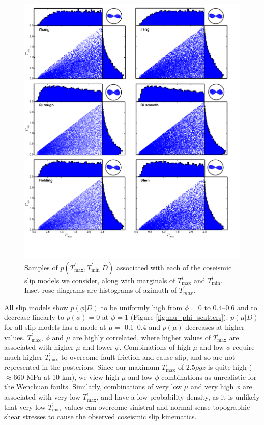 \documentclass[twocolumn,jgrga]{AGUTeX}
\begin{document}
\begin{article}
\begin{figure}%
\centering
\includegraphics[width=40pc]{../figures/T_scatters.pdf}
\caption{Samples of
$p(T^\prime_{\mathrm{max}},T^\prime_{\mathrm{min}} | D)$ associated with
each of the coseismic slip models we consider, along with marginals of
$T^\prime_{\mathrm{max}}$ and $T^\prime_{\mathrm{min}}$. Inset rose
diagrams are histograms of azimuth of
$T^\prime_{max}$.}
\label{fig:T_scatters}
\end{figure}

All slip models show $p(\phi | D)$ to be uniformly high from $\phi = 0$
to 0.4--0.6 and to decrease linearly to $p(\phi) = 0$ at $\phi = 1$
(Figure \ref{fig:mu_phi_scatters}). $p(\mu | D)$ for all slip models has
a mode at $\mu =$ 0.1--0.4 and $p(\mu)$ decreases at higher values.
$T^\prime_{\mathrm{max}}$, $\phi$ and $\mu$ are highly correlated, where
higher values of $T^\prime_{\mathrm{max}}$ are associated with higher
$\mu$ and lower $\phi$. Combinations of high $\mu$ and low $\phi$
require much higher $T^\prime_{\mathrm{max}}$ to overcome fault friction
and cause slip, and so are not represented in the posteriors. Since our
maximum $T_{\mathrm{max}}$ of $2.5 \rho g z$ is quite high
($\approx 660$ MPa at 10 km), we view high $\mu$ and low $\phi$
combinations as unrealistic for the Wenchuan faults. Similarly,
combinations of very low $\mu$ and very high $\phi$ are associated with
very low $T^\prime_{\mathrm{max}}$, and have a low probability density,
as it is unlikely that very low $T^\prime_{\mathrm{max}}$ values can
overcome sinistral and normal-sense topographic shear stresses to cause
the observed coseismic slip kinematics.


\end{article}
\end{document}
